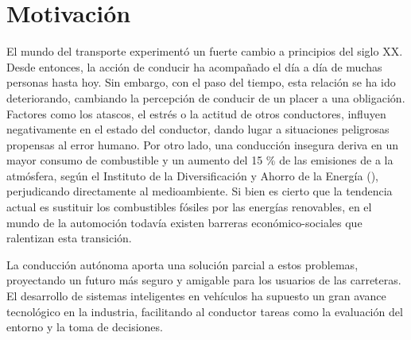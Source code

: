 \section{Motivación}

El mundo del transporte experimentó un fuerte cambio a principios del siglo XX. Desde entonces, la acción de conducir ha acompañado el día a día de muchas personas hasta hoy. Sin embargo, con el paso del tiempo, esta relación se ha ido deteriorando, cambiando la percepción de conducir de un placer a una obligación. Factores como los atascos, el estrés o la actitud de otros conductores, influyen negativamente en el estado del conductor, dando lugar a situaciones peligrosas propensas al error humano.  Por otro lado, una conducción insegura deriva en un mayor consumo de combustible y un aumento del 15 \% de las emisiones de  a la atmósfera, según el Instituto de la Diversificación y Ahorro de la Energía (\cite{energetica}), perjudicando directamente al medioambiente. Si bien es cierto que la tendencia actual es sustituir los combustibles fósiles por las energías renovables, en el mundo de la automoción todavía existen barreras económico-sociales que ralentizan esta transición.

La conducción autónoma aporta una solución parcial a estos problemas, proyectando un futuro más seguro y amigable para los usuarios de las carreteras. El desarrollo de sistemas inteligentes en vehículos ha supuesto un gran avance tecnológico en la industria, facilitando al conductor tareas como la evaluación del entorno y la toma de decisiones. 

